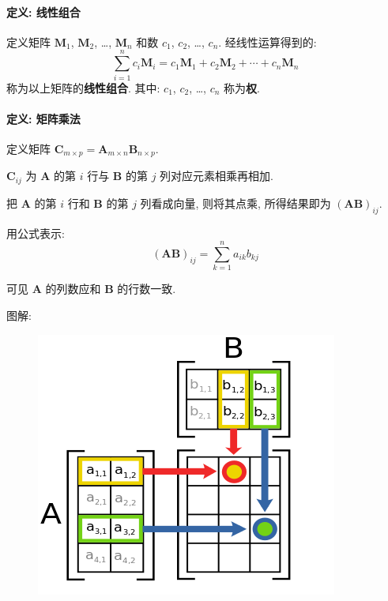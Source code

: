 \documentclass[UTF8]{ctexart}
\newcommand{\ve}[1]{\boldsymbol{\mathbf{#1}}}
\begin{document}
\begin{framed}
    \vspace{-0.7em}
    \paragraph{定义: 线性组合}
    定义矩阵 $ \ve M_1 $, $ \ve M_2 $, \dots, $ \ve M_n $ 和数 $ c_1 $, $ c_2 $, \dots, $ c_n $. 经线性运算得到的: 
    \[ \sum_{i = 1}^n c_i \ve M_i = c_1 \ve M_1 + c_2 \ve M_2 + \cdots + c_n \ve M_n \]
    称为以上矩阵的\textbf{线性组合}. 其中: $ c_1 $, $ c_2 $, \dots, $ c_n $ 称为\textbf{权}.
\end{framed}

\newpage
\begin{framed}
    \vspace{-0.7em}
    \paragraph{定义: 矩阵乘法}
    定义矩阵 $ \ve C_{m \times p} = \ve A_{m \times n} \ve B_{n \times p} $.

    \begin{center}
        $ \ve C_{ij} $ 为 $ \ve A $ 的第 $ i $ 行与 $ \ve B $ 的第 $ j $ 列对应元素相乘再相加.
    \end{center}

    把 $ \ve A $ 的第 $ i $ 行和 $ \ve B $ 的第 $ j $ 列看成向量, 则将其点乘, 所得结果即为 $ (\ve A \ve B)_{ij} $.

    用公式表示:
    \[ (\ve A \ve B)_{ij} = \sum_{k = 1}^n a_{ik} b_{kj} \]

    可见 $ \ve A $ 的列数应和 $ \ve B $ 的行数一致.
\end{framed}

图解:
\begin{figure}[H]
     \centering
     \includegraphics[width = 0.5\linewidth]{Matrix_multiplication.png}
\end{figure}
\end{document}
